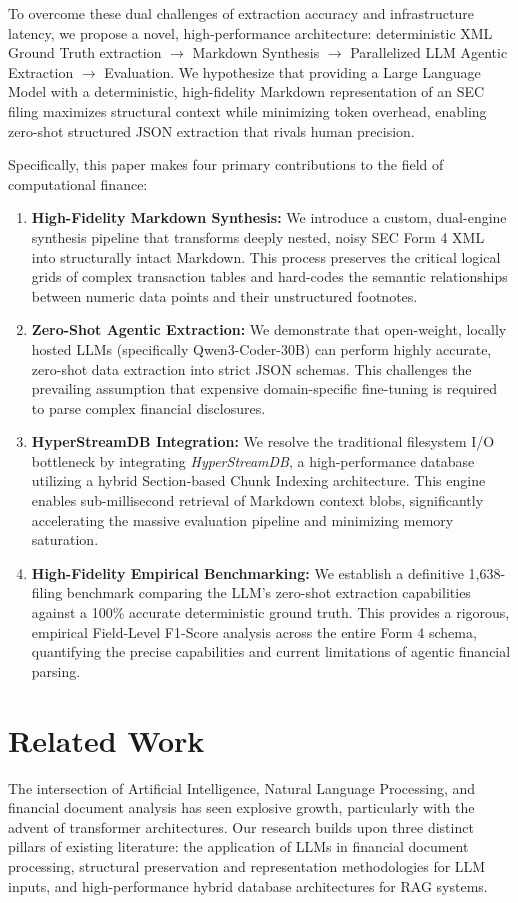 \documentclass[journal, onecolumn]{IEEEtran}
\begin{document}
To overcome these dual challenges of extraction accuracy and infrastructure latency, we propose a novel, high-performance architecture: deterministic XML Ground Truth extraction $\to$ Markdown Synthesis $\to$ Parallelized LLM Agentic Extraction $\to$ Evaluation. We hypothesize that providing a Large Language Model with a deterministic, high-fidelity Markdown representation of an SEC filing maximizes structural context while minimizing token overhead, enabling zero-shot structured JSON extraction that rivals human precision.

Specifically, this paper makes four primary contributions to the field of computational finance:
\begin{enumerate}
    \item \textbf{High-Fidelity Markdown Synthesis:} We introduce a custom, dual-engine synthesis pipeline that transforms deeply nested, noisy SEC Form 4 XML into structurally intact Markdown. This process preserves the critical logical grids of complex transaction tables and hard-codes the semantic relationships between numeric data points and their unstructured footnotes.
    \item \textbf{Zero-Shot Agentic Extraction:} We demonstrate that open-weight, locally hosted LLMs (specifically Qwen3-Coder-30B) can perform highly accurate, zero-shot data extraction into strict JSON schemas. This challenges the prevailing assumption that expensive domain-specific fine-tuning is required to parse complex financial disclosures.
    \item \textbf{HyperStreamDB Integration:} We resolve the traditional filesystem I/O bottleneck by integrating \textit{HyperStreamDB}, a high-performance database utilizing a hybrid Section-based Chunk Indexing architecture. This engine enables sub-millisecond retrieval of Markdown context blobs, significantly accelerating the massive evaluation pipeline and minimizing memory saturation.
    \item \textbf{High-Fidelity Empirical Benchmarking:} We establish a definitive 1,638-filing benchmark comparing the LLM's zero-shot extraction capabilities against a 100\% accurate deterministic ground truth. This provides a rigorous, empirical Field-Level F1-Score analysis across the entire Form 4 schema, quantifying the precise capabilities and current limitations of agentic financial parsing.
\end{enumerate}

\section{Related Work}
The intersection of Artificial Intelligence, Natural Language Processing, and financial document analysis has seen explosive growth, particularly with the advent of transformer architectures. Our research builds upon three distinct pillars of existing literature: the application of LLMs in financial document processing, structural preservation and representation methodologies for LLM inputs, and high-performance hybrid database architectures for RAG systems.
\end{document}
